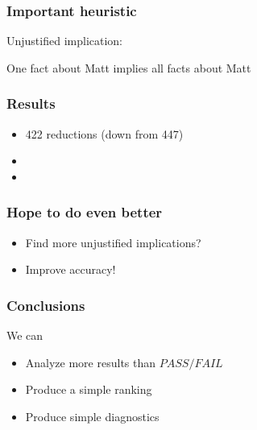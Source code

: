 \documentclass[svgnames,14pt]{beamer}
\newcommand\fail{\mathit{FAIL}}
\newcommand\pass{\mathit{PASS}}
\theoremstyle{definition}
\begin{document}
\begin{frame}
\frametitle{Important heuristic}
Unjustified implication:
\begin{block}{}
One fact about Matt implies all facts about Matt
\end{block}
\end{frame}

\begin{frame}
\frametitle{Results}
\begin{itemize}
\item 422 reductions (down from 447)
\item {}
\item {}
\end{itemize}
\end{frame}

\begin{frame}
\frametitle{Hope to do even better}
\begin{itemize}
\item
Find more unjustified implications?
\item
Improve accuracy!
\end{itemize}
\end{frame}

\begin{frame}
\frametitle{Conclusions}
We can
\begin{itemize}
\item<2-> Analyze more results than $\pass/\fail$
\item<3-> Produce a simple ranking 
\item<4-> Produce simple diagnostics 
\end{itemize}
\end{frame}
\end{document}

